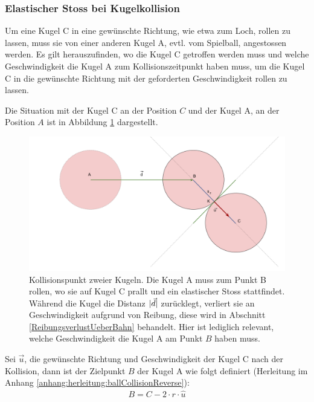 \newpage
\subsubsection{Elastischer Stoss bei Kugelkollision}\label{EnergieuebergabeBeiKollision}

Um eine Kugel C in eine gewünschte Richtung, wie etwa zum Loch, rollen zu lassen, muss sie von einer anderen Kugel A,
evtl. vom Spielball, angestossen werden.
Es gilt herauszufinden, wo die Kugel C getroffen werden muss und welche Geschwindigkeit die Kugel A zum Kollisionszeitpunkt
haben muss, um die Kugel C in die gewünschte Richtung mit der geforderten Geschwindigkeit rollen zu lassen.

Die Situation mit der Kugel C an der Position $C$ und der Kugel A, an der Position $A$ ist in Abbildung \ref{fig:ballCollisionPointReverse}
dargestellt.

\begin{figure}[h!]
    \begin{center}
        \includegraphics[width=0.6\linewidth]{../common/03_billiard_ai/resources/21_kollisionspunkt_rueckwaerts.png}
    \end{center}
    \caption{Kollisionspunkt zweier Kugeln.
    Die Kugel A muss zum Punkt B rollen, wo sie auf Kugel C prallt und ein elastischer Stoss \cite{wiki.elastischer_stoss_physik:1} stattfindet.
    Während die Kugel die Distanz $\lvert \vec{d} \rvert$ zurücklegt, verliert sie an Geschwindigkeit aufgrund von Reibung,
    diese wird in Abschnitt \ref{ReibungsverlustUeberBahn} behandelt. Hier ist lediglich relevant, welche Geschwindigkeit
    die Kugel A am Punkt $B$ haben muss.
    }
    \label{fig:ballCollisionPointReverse}
\end{figure}

Sei $\vec{u}$, die gewünschte Richtung und Geschwindigkeit der Kugel C nach der Kollision,
dann ist der Zielpunkt $B$ der Kugel A wie folgt definiert (Herleitung im Anhang \ref{anhang:herleitung:ballCollisionReverse}):
\begin{align}
    B = C - 2 \cdot r \cdot \hat{u}
\end{align}

